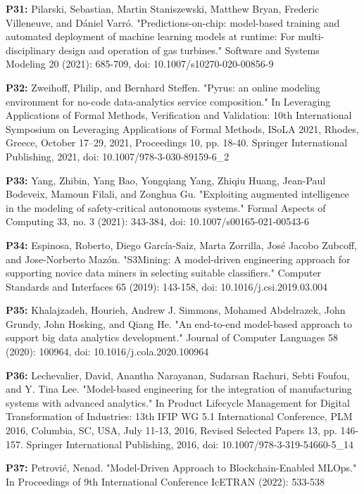 \begin{footnotesize}
\textbf{P31: } Pilarski, Sebastian, Martin Staniszewski, Matthew Bryan, Frederic Villeneuve, and Dániel Varró. "Predictions-on-chip: model-based training and automated deployment of machine learning models at runtime: For multi-disciplinary design and operation of gas turbines." Software and Systems Modeling 20 (2021): 685-709, doi: 10.1007/s10270-020-00856-9

\textbf{P32: } Zweihoff, Philip, and Bernhard Steffen. "Pyrus: an online modeling environment for no-code data-analytics service composition." In Leveraging Applications of Formal Methods, Verification and Validation: 10th International Symposium on Leveraging Applications of Formal Methods, ISoLA 2021, Rhodes, Greece, October 17–29, 2021, Proceedings 10, pp. 18-40. Springer International Publishing, 2021, doi: 10.1007/978-3-030-89159-6\_2

\textbf{P33: } Yang, Zhibin, Yang Bao, Yongqiang Yang, Zhiqiu Huang, Jean-Paul Bodeveix, Mamoun Filali, and Zonghua Gu. "Exploiting augmented intelligence in the modeling of safety-critical autonomous systems." Formal Aspects of Computing 33, no. 3 (2021): 343-384, doi: 10.1007/s00165-021-00543-6

\textbf{P34: } Espinosa, Roberto, Diego García-Saiz, Marta Zorrilla, José Jacobo Zubcoff, and Jose-Norberto Mazón. "S3Mining: A model-driven engineering approach for supporting novice data miners in selecting suitable classifiers." Computer Standards and Interfaces 65 (2019): 143-158, doi: 10.1016/j.csi.2019.03.004

\textbf{P35: } Khalajzadeh, Hourieh, Andrew J. Simmons, Mohamed Abdelrazek, John Grundy, John Hosking, and Qiang He. "An end-to-end model-based approach to support big data analytics development." Journal of Computer Languages 58 (2020): 100964, doi: 10.1016/j.cola.2020.100964

\textbf{P36: } Lechevalier, David, Anantha Narayanan, Sudarsan Rachuri, Sebti Foufou, and Y. Tina Lee. "Model-based engineering for the integration of manufacturing systems with advanced analytics." In Product Lifecycle Management for Digital Transformation of Industries: 13th IFIP WG 5.1 International Conference, PLM 2016, Columbia, SC, USA, July 11-13, 2016, Revised Selected Papers 13, pp. 146-157. Springer International Publishing, 2016, doi: 10.1007/978-3-319-54660-5\_14

\textbf{P37: } Petrović, Nenad. "Model-Driven Approach to Blockchain-Enabled MLOps." In Proceedings of 9th International Conference IcETRAN (2022): 533-538


\end{footnotesize}
